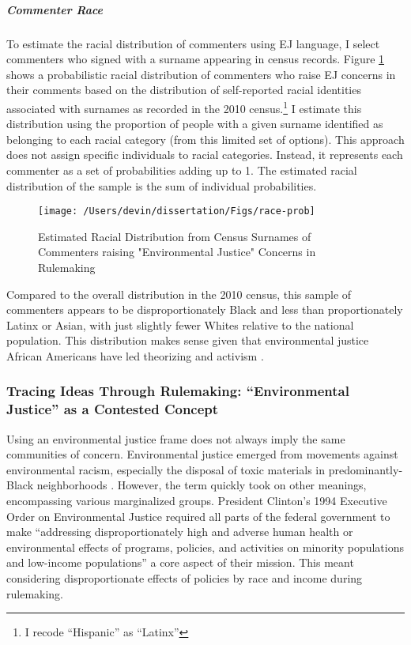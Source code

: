\documentclass[
      12pt,
        ]{article}
\begin{document}
\hypertarget{commenter-race}{%
\subparagraph{Commenter Race}\label{commenter-race}}

To estimate the racial distribution of commenters
using EJ language, I select commenters who
signed with a
surname appearing in census records. Figure
\ref{fig:ejcommentsbyrace} shows a probabilistic racial
distribution of commenters who raise EJ concerns in
their comments based on the distribution of self-reported racial identities
associated with surnames as recorded in the 2010 census.\footnote{I recode ``Hispanic'' as ``Latinx''} I estimate this distribution using the proportion of people with a given surname identified as belonging to each racial
category (from this limited set of options). This approach does not
assign specific individuals to racial categories. Instead, it represents each commenter as a set of probabilities adding up to 1. The estimated racial distribution of the sample is the sum of individual probabilities.

\begin{figure}

{\centering \texttt{[image: /Users/devin/dissertation/Figs/race-prob]} 

}

\caption{Estimated Racial Distribution from Census Surnames of Commenters raising "Environmental Justice" Concerns in Rulemaking}\label{fig:ejcommentsbyrace}
\end{figure}

Compared to the overall distribution in the 2010 census, this sample of commenters appears to be disproportionately Black and less than proportionately
Latinx or Asian, with just slightly fewer Whites relative to the
national population. This distribution makes sense given that environmental justice
African Americans have led theorizing and activism
\citep{Bullard1993}.

\hypertarget{tracing-ideas-through-rulemaking-environmental-justice-as-a-contested-concept}{%
\subsubsection{Tracing Ideas Through Rulemaking: ``Environmental Justice'' as a Contested Concept}\label{tracing-ideas-through-rulemaking-environmental-justice-as-a-contested-concept}}

Using an environmental justice frame does not always imply the same
communities of concern. Environmental justice emerged from movements
against environmental racism, especially the disposal of toxic
materials in predominantly-Black neighborhoods \citep{Bullard1993}. However, the term
quickly took on other meanings, encompassing various marginalized groups. President Clinton's 1994 Executive Order on
Environmental Justice required all parts of the federal government
to make ``addressing disproportionately high and adverse human health or
environmental effects of programs, policies, and activities on minority
populations and low-income populations'' a core aspect of their mission.
This meant considering disproportionate effects of policies by race and income during rulemaking.
\end{document}
